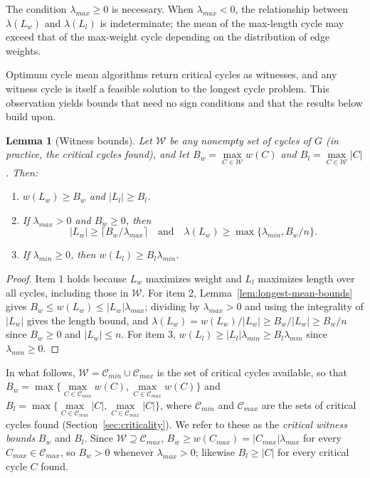 \documentclass{article}
\newtheorem{lem}{Lemma}[section]
\theoremstyle{definition}
\begin{document}
The condition $\lambda_{max} \geq 0$ is necessary. When $\lambda_{max}
< 0$, the relationship between $\lambda(L_w)$ and $\lambda(L_l)$ is
indeterminate; the mean of the max-length cycle may exceed that of the
max-weight cycle depending on the distribution of edge weights.

Optimum cycle mean algorithms return critical cycles as witnesses, and
any witness cycle is itself a feasible solution to the longest cycle
problem. This observation yields bounds that need no sign conditions
and that the results below build upon.

\begin{lem}[Witness bounds]
\label{lem:witness}
Let $\mathcal{W}$ be any nonempty set of cycles of $G$ (in practice, the
critical cycles found), and let $B_w = \max\limits_{C \in \mathcal{W}} w(C)$
and $B_l = \max\limits_{C \in \mathcal{W}} |C|$. Then:
\begin{enumerate}
\item $w(L_w) \geq B_w$ and $|L_l| \geq B_l$.
\item If $\lambda_{max} > 0$ and $B_w \geq 0$, then
  \begin{equation*}
    |L_w| \geq \lceil B_w/\lambda_{max} \rceil
    \quad \text{and} \quad
    \lambda(L_w) \geq \max\{\lambda_{min}, B_w/n\}.
  \end{equation*}
\item If $\lambda_{min} \geq 0$, then $w(L_l) \geq B_l\lambda_{min}$.
\end{enumerate}
\end{lem}

\begin{proof}
Item 1 holds because $L_w$ maximizes weight and $L_l$ maximizes length
over all cycles, including those in $\mathcal{W}$. For item 2,
Lemma~\ref{lem:longest-mean-bounds} gives $B_w \leq w(L_w) \leq
|L_w|\lambda_{max}$; dividing by $\lambda_{max} > 0$ and using the
integrality of $|L_w|$ gives the length bound, and $\lambda(L_w) =
w(L_w)/|L_w| \geq B_w/|L_w| \geq B_w/n$ since $B_w \geq 0$ and $|L_w| \leq
n$. For item 3, $w(L_l) \geq |L_l|\lambda_{min} \geq B_l\lambda_{min}$
since $\lambda_{min} \geq 0$.
\end{proof}

In what follows, $\mathcal{W} = \mathcal{C}_{min} \cup
\mathcal{C}_{max}$ is the set of critical cycles available, so that
$B_w = \max\{\max\limits_{C \in \mathcal{C}_{min}} w(C),
\max\limits_{C \in \mathcal{C}_{max}} w(C)\}$ and $B_l = \max\{\max\limits_{C \in
  \mathcal{C}_{min}} |C|, \max\limits_{C \in \mathcal{C}_{max}} |C|\}$, where
$\mathcal{C}_{min}$ and $\mathcal{C}_{max}$ are the sets of critical
cycles found (Section~\ref{sec:criticality}). We refer to these as
the \textit{critical witness bounds} $B_w$ and $B_l$. Since $\mathcal{W}
\supseteq \mathcal{C}_{max}$, $B_w \geq w(C_{max}) =
|C_{max}|\lambda_{max}$ for every $C_{max} \in \mathcal{C}_{max}$, so
$B_w > 0$ whenever $\lambda_{max} > 0$; likewise $B_l \geq |C|$ for every
critical cycle $C$ found.
\end{document}
